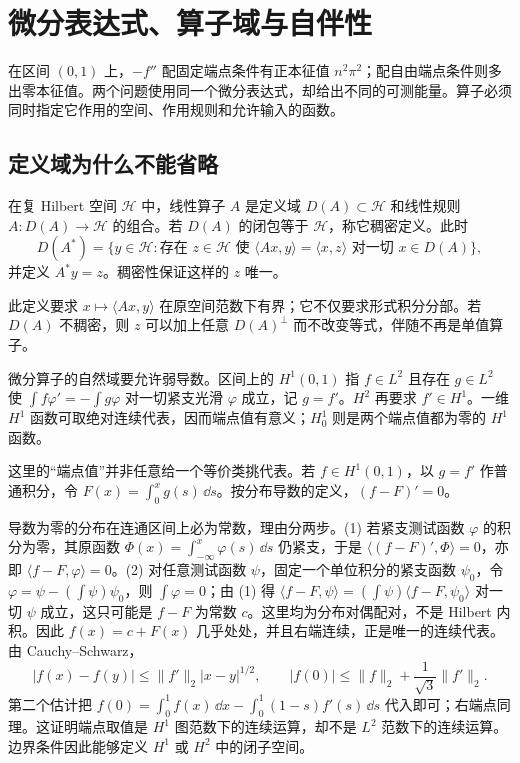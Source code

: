 \chapter{微分表达式、算子域与自伴性}
\label{chap:math-unbounded}

在区间 \((0,1)\) 上，\(-f''\) 配固定端点条件有正本征值 \(n^2\pi^2\)；配自由端点条件则多出零本征值。两个问题使用同一个微分表达式，却给出不同的可测能量。算子必须同时指定它作用的空间、作用规则和允许输入的函数。

\section{定义域为什么不能省略}

\begin{definition}[稠密定义的算子与伴随]
在复 Hilbert 空间 \(\mathcal H\) 中，线性算子 \(A\) 是定义域 \(D(A)\subset\mathcal H\) 和线性规则 \(A:D(A)\to\mathcal H\) 的组合。若 \(D(A)\) 的闭包等于 \(\mathcal H\)，称它稠密定义。此时
\[
D(A^*)=\{y\in\mathcal H:\text{存在 }z\in\mathcal H\text{ 使 }\langle Ax,y\rangle=\langle x,z\rangle\text{ 对一切 }x\in D(A)\},
\]
并定义 \(A^*y=z\)。稠密性保证这样的 \(z\) 唯一。
\end{definition}

此定义要求 \(x\mapsto\langle Ax,y\rangle\) 在原空间范数下有界；它不仅要求形式积分分部。若 \(D(A)\) 不稠密，则 \(z\) 可以加上任意 \(D(A)^\perp\) 而不改变等式，伴随不再是单值算子。

微分算子的自然域要允许弱导数。区间上的 \(H^1(0,1)\) 指 \(f\in L^2\) 且存在 \(g\in L^2\) 使 \(\int f\varphi'=-\int g\varphi\) 对一切紧支光滑 \(\varphi\) 成立，记 \(g=f'\)。\(H^2\) 再要求 \(f'\in H^1\)。一维 \(H^1\) 函数可取绝对连续代表，因而端点值有意义；\(H_0^1\) 则是两个端点值都为零的 \(H^1\) 函数。

这里的“端点值”并非任意给一个等价类挑代表。若 \(f\in H^1(0,1)\)，以 \(g=f'\) 作普通积分，令 \(F(x)=\int_0^x g(s)\,\dd s\)。按分布导数的定义，\((f-F)'=0\)。

导数为零的分布在连通区间上必为常数，理由分两步。(1) 若紧支测试函数 \(\varphi\) 的积分为零，其原函数 \(\Phi(x)=\int_{-\infty}^x\varphi(s)\,\dd s\) 仍紧支，于是 \(\langle (f-F)',\Phi\rangle=0\)，亦即 \(\langle f-F,\varphi\rangle=0\)。(2) 对任意测试函数 \(\psi\)，固定一个单位积分的紧支函数 \(\psi_0\)，令 \(\varphi=\psi-(\int\psi)\psi_0\)，则 \(\int\varphi=0\)；由 (1) 得
\(\langle f-F,\psi\rangle=(\int\psi)\langle f-F,\psi_0\rangle\) 对一切 \(\psi\) 成立，这只可能是 \(f-F\) 为常数 \(c\)。这里均为分布对偶配对，不是 Hilbert 内积。因此 \(f(x)=c+F(x)\) 几乎处处，并且右端连续，正是唯一的连续代表。由 Cauchy--Schwarz，
\[
 |f(x)-f(y)|\le\|f'\|_2|x-y|^{1/2},\qquad
 |f(0)|\le \|f\|_2+\frac1{\sqrt3}\|f'\|_2.
\]
第二个估计把 \(f(0)=\int_0^1f(x)\,\dd x-\int_0^1(1-s)f'(s)\,\dd s\) 代入即可；右端点同理。这证明端点取值是 \(H^1\) 图范数下的连续运算，却不是 \(L^2\) 范数下的连续运算。边界条件因此能够定义 \(H^1\) 或 \(H^2\) 中的闭子空间。

